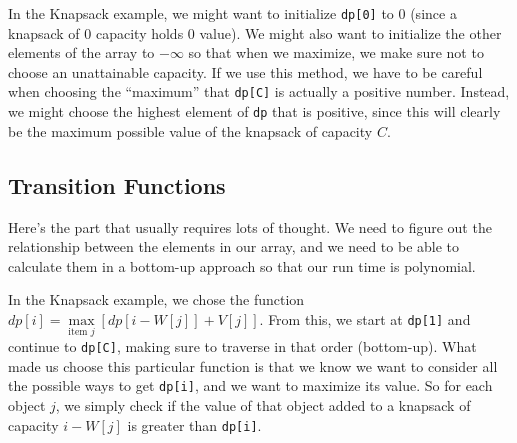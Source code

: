 In the Knapsack example, we might want to initialize \verb=dp[0]= to $0$ (since a knapsack of $0$ capacity holds $0$ value).  We might also want to initialize the other elements of the array to $-\infty$ so that when we maximize, we make sure not to choose an unattainable capacity.  If we use this method, we have to be careful when choosing the ``maximum'' that \verb=dp[C]= is actually a positive number.  Instead, we might choose the highest element of \verb=dp= that is positive, since this will clearly be the maximum possible value of the knapsack of capacity $C$.
%
\subsection{Transition Functions}
Here's the part that usually requires lots of thought.  We need to figure out the relationship between the elements in our array, and we need to be able to calculate them in a bottom-up approach so that our run time is polynomial.

In the Knapsack example, we chose the function $dp[i] = \max\limits_{\text{item } j} \left[dp[i-W[j]]+V[j]\right]$.  From this, we start at \verb=dp[1]= and continue to \verb=dp[C]=, making sure to traverse in that order (bottom-up).  What made us choose this particular function is that we know we want to consider all the possible ways to get \verb=dp[i]=, and we want to maximize its value.  So for each object $j$, we simply check if the value of that object added to a knapsack of capacity $i-W[j]$ is greater than \verb=dp[i]=.
